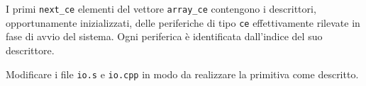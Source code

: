 I primi \verb|next_ce| elementi del vettore \verb|array_ce| contengono i descrittori, opportunamente inizializzati,
delle periferiche di tipo \verb|ce| effettivamente rilevate in fase di avvio del sistema. Ogni periferica \`e identificata
dall'indice del suo descrittore.

Modificare i file \verb|io.s| e \verb|io.cpp| in modo da realizzare la primitiva come descritto.
